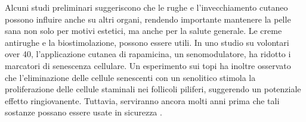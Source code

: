 \documentclass[12pt]{book} %
\begin{document}
\begin{mdframed}[linewidth=1pt]
Alcuni studi preliminari suggeriscono che le rughe e l’invecchiamento cutaneo possono influire anche su altri organi, rendendo importante mantenere la pelle sana non solo per motivi estetici, ma anche per la salute generale. Le creme antirughe e la biostimolazione, possono essere utili. In uno studio su volontari over 40, l’applicazione cutanea di rapamicina, un senomodulatore, ha ridotto i marcatori di senescenza cellulare. Un esperimento sui topi ha inoltre osservato che l’eliminazione delle cellule senescenti con un senolitico stimola la proliferazione delle cellule staminali nei follicoli piliferi, suggerendo un potenziale effetto ringiovanente. Tuttavia, serviranno ancora molti anni prima che tali sostanze possano essere usate in sicurezza   .
\end{mdframed}
\end{document}
